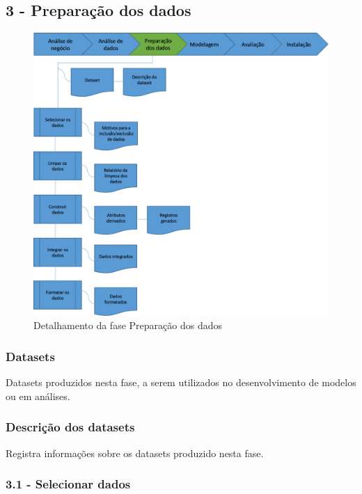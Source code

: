 \newpage

\subsection*{3 - Preparação dos dados}


\begin{figure}[H]
	\includegraphics[scale=0.8]{img/CRISP-DM-Preparacao-dos-dados.png}
	\caption{Detalhamento da fase Preparação dos dados}
	\label{img:CRISP-DM-Preparacao-dos-dados}
\end{figure}


\subsubsection*{Datasets}

Datasets produzidos nesta fase, a serem utilizados no desenvolvimento de modelos ou em análises.

\subsubsection*{Descrição dos datasets}

Registra informações sobre os datasets produzido nesta fase.

\subsubsection*{\textbf{3.1 - Selecionar dados}}

